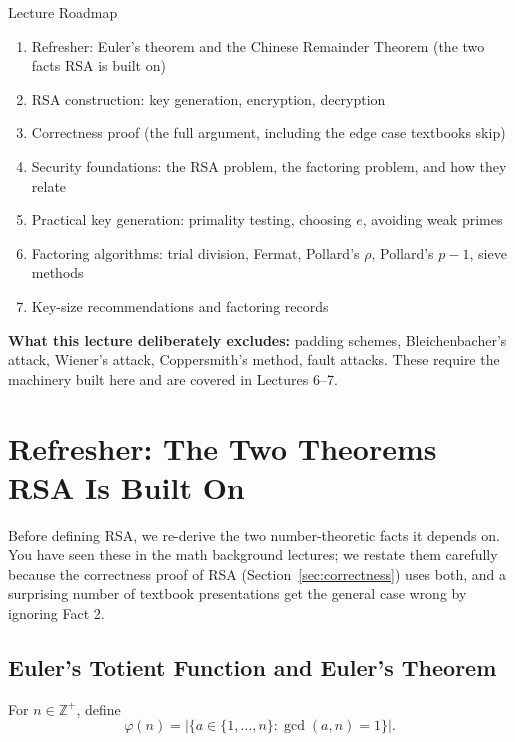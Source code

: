 \vspace{0.5cm}
\begin{keybox}{Lecture Roadmap}
\begin{enumerate}[label=(\arabic*)]
\item Refresher: Euler's theorem and the Chinese Remainder Theorem (the two facts RSA is built on)
\item RSA construction: key generation, encryption, decryption
\item Correctness proof (the full argument, including the edge case textbooks skip)
\item Security foundations: the RSA problem, the factoring problem, and how they relate
\item Practical key generation: primality testing, choosing $e$, avoiding weak primes
\item Factoring algorithms: trial division, Fermat, Pollard's $\rho$, Pollard's $p-1$, sieve methods
\item Key-size recommendations and factoring records
\end{enumerate}
\textbf{What this lecture deliberately excludes:} padding schemes, Bleichenbacher's attack, Wiener's attack, Coppersmith's method, fault attacks. These require the machinery built here and are covered in Lectures 6--7.
\end{keybox}

\newpage

\section{Refresher: The Two Theorems RSA Is Built On}

Before defining RSA, we re-derive the two number-theoretic facts it depends on. You have seen these in the math background lectures; we restate them carefully because the correctness proof of RSA (Section~\ref{sec:correctness}) uses both, and a surprising number of textbook presentations get the general case wrong by ignoring Fact 2.

\subsection{Euler's Totient Function and Euler's Theorem}

\begin{definition}
For $n \in \mathbb{Z}^{+}$, define
\[
\varphi(n) = |\{a \in \{1, \dots, n\} : \gcd(a,n) = 1\}|.
\]
\end{definition}

